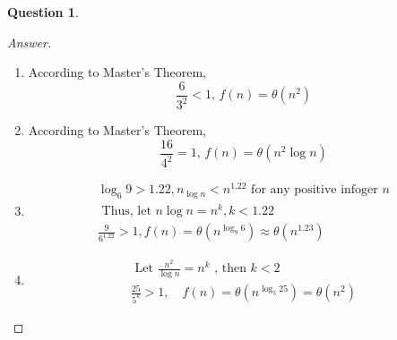 \documentclass{article}
\theoremstyle{plain}
\newtheorem{question}{Question}
\newenvironment{answer}[1][Answer]
    {\begin{proof}[#1]{$ $}\renewcommand\qedsymbol{$\vartriangle$}}
    {\end{proof}}
\begin{document}
\begin{question}
\end{question}
\begin{answer}
    \begin{enumerate}
        \item
        According to Master's Theorem,
        \begin{equation*}
            \frac{6}{3^2} < 1,\,f(n) = \theta(n^2)
        \end{equation*}
        \item
        According to Master's Theorem,
        \begin{equation*}
            \frac{16}{4^2} = 1,\,f(n) = \theta(n^2 \log n)
        \end{equation*}
        \item
        \begin{equation*}
        \begin{aligned}
        \log _{6} 9>1.22, n_{\log n}<n^{1.22} \text { for any positive infoger } n \\
        \text { Thus, let } n \log n=n^{k}, k<1.22 \\
        \frac{9}{6^{1.22}}>1, f(n)=\theta\left(n^{\log_{9} 6}\right) \approx \theta\left(n^{1.23}\right)
        \end{aligned}
        \end{equation*}
        \item
        \begin{equation*}
        \begin{aligned}
        \text { Let } \frac{n^{2}}{\log n}=n^{k}\text { , then } k<2 \\
        \frac{25}{5^{k}}>1, \quad f(n)=\theta\left(n^{\log_5 25}\right)=\theta\left(n^{2}\right)
    \end{aligned}
\end{equation*}
    \end{enumerate}
\end{answer}
\end{document}
